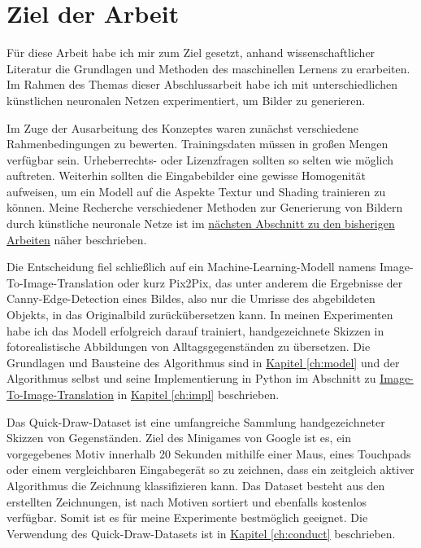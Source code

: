 \section{Ziel der Arbeit}
\label{sec:ziel}
Für diese Arbeit habe ich mir zum Ziel gesetzt, anhand wissenschaftlicher Literatur die Grundlagen und Methoden des maschinellen Lernens zu erarbeiten. Im Rahmen des Themas dieser Abschlussarbeit habe ich mit unterschiedlichen künstlichen neuronalen Netzen experimentiert, um Bilder zu generieren.

Im Zuge der Ausarbeitung des Konzeptes waren zunächst verschiedene Rahmenbedingungen zu bewerten. Trainingsdaten müssen in großen Mengen verfügbar sein. Urheberrechts- oder Lizenzfragen sollten so selten wie möglich auftreten. Weiterhin sollten die Eingabebilder eine gewisse Homogenität aufweisen, um ein Modell auf die Aspekte Textur und Shading trainieren zu können. Meine Recherche verschiedener Methoden zur Generierung von Bildern durch künstliche neuronale Netze ist im \hyperref[sec:related]{nächsten Abschnitt zu den bisherigen Arbeiten} näher beschrieben.

Die Entscheidung fiel schließlich auf ein Machine-Learning-Modell namens Image-To-Image-Translation \cite{isola2018imagetoimage} oder kurz Pix2Pix, das unter anderem die Ergebnisse der Canny-Edge-Detection \cite{canny1986edge} eines Bildes, also nur die Umrisse des abgebildeten Objekts, in das Originalbild zurückübersetzen kann. In meinen Experimenten habe ich das Modell erfolgreich darauf trainiert, handgezeichnete Skizzen in fotorealistische Abbildungen von Alltagsgegenständen zu übersetzen. Die Grundlagen und Bausteine des Algorithmus sind in \hyperref[ch:model]{Kapitel \ref{ch:model}} und der Algorithmus selbst und seine Implementierung in Python im Abschnitt zu \hyperref[sec:pix2pix]{Image-To-Image-Translation} in \hyperref[ch:impl]{Kapitel \ref{ch:impl}} beschrieben.

Das Quick-Draw-Dataset ist eine umfangreiche Sammlung handgezeichneter Skizzen von Gegenständen. Ziel des Minigames von Google ist es, ein vorgegebenes Motiv innerhalb 20 Sekunden mithilfe einer Maus, eines Touchpads oder einem vergleichbaren Eingabegerät so zu zeichnen, dass ein zeitgleich aktiver Algorithmus die Zeichnung klassifizieren kann. Das Dataset besteht aus den erstellten Zeichnungen, ist nach Motiven sortiert und ebenfalls kostenlos verfügbar. Somit ist es für meine Experimente bestmöglich geeignet. Die Verwendung des Quick-Draw-Datasets ist in \hyperref[ch:conduct]{Kapitel \ref{ch:conduct}} beschrieben.

